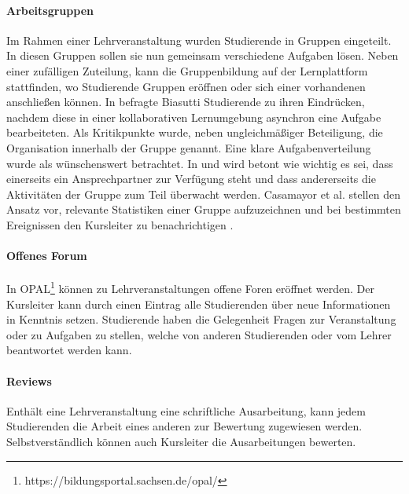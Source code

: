 \documentclass[conference]{IEEEtran}
\begin{document}
\paragraph{Arbeitsgruppen} Im Rahmen einer Lehrveranstaltung wurden Studierende in Gruppen eingeteilt. In diesen Gruppen sollen sie nun gemeinsam verschiedene Aufgaben lösen. Neben einer zufälligen Zuteilung, kann die Gruppenbildung auf der Lernplattform stattfinden, wo Studierende Gruppen eröffnen oder sich einer vorhandenen anschließen können. In \cite{dewiyanti2007students} befragte Biasutti Studierende zu ihren Eindrücken, nachdem diese in einer kollaborativen Lernumgebung asynchron eine Aufgabe bearbeiteten. Als Kritikpunkte wurde, neben ungleichmäßiger Beteiligung, die Organisation innerhalb der Gruppe genannt. Eine klare Aufgabenverteilung wurde als wünschenswert betrachtet. In \cite{paechter2010students} und \cite{casamayor2009intelligent} wird betont wie wichtig es sei, dass einerseits ein Ansprechpartner zur Verfügung steht und dass  andererseits die Aktivitäten der Gruppe zum Teil überwacht werden. Casamayor et al. stellen den Ansatz vor, relevante Statistiken einer Gruppe aufzuzeichnen und bei bestimmten Ereignissen den Kursleiter zu benachrichtigen \cite{casamayor2009intelligent}. 
\paragraph{Offenes Forum} In OPAL\footnote{https://bildungsportal.sachsen.de/opal/} können zu Lehrveranstaltungen offene Foren eröffnet werden. Der Kursleiter kann durch einen Eintrag alle Studierenden über neue Informationen in Kenntnis setzen. Studierende haben die Gelegenheit Fragen zur Veranstaltung oder zu Aufgaben zu stellen, welche von anderen Studierenden oder vom Lehrer beantwortet werden kann.
\paragraph{Reviews} Enthält eine Lehrveranstaltung eine schriftliche Ausarbeitung, kann jedem Studierenden die Arbeit eines anderen zur Bewertung zugewiesen werden. Selbstverständlich können auch Kursleiter die Ausarbeitungen bewerten. 
	


	
\end{document}
